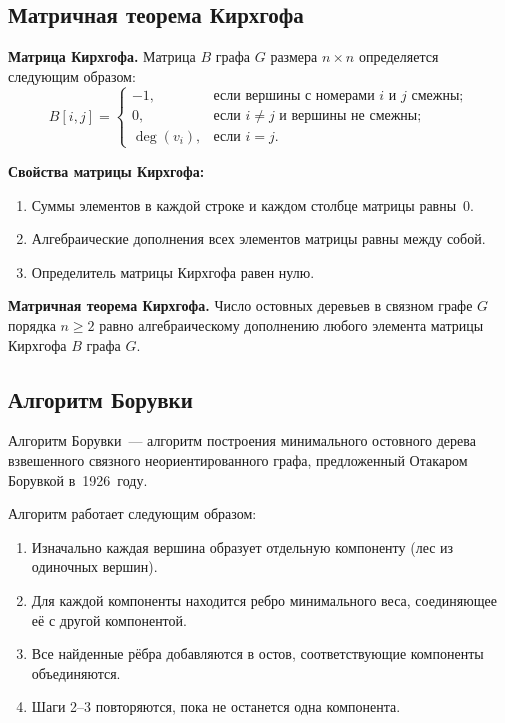 \documentclass[a4paper,final]{article}
\begin{document}
	\subsection{Матричная теорема Кирхгофа}

\textbf{Матрица Кирхгофа.} Матрица $B$ графа $G$ размера $n \times n$ определяется следующим образом:
\[
B[i,j] = \begin{cases}
-1, & \text{если вершины с номерами } i \text{ и } j \text{ смежны};\\[2pt]
0,  & \text{если } i \neq j \text{ и вершины не смежны};\\[2pt]
\deg(v_i), & \text{если } i = j.
\end{cases}
\]

\textbf{Свойства матрицы Кирхгофа:}
\begin{enumerate}
  \item Суммы элементов в каждой строке и каждом столбце матрицы равны~0.
  \item Алгебраические дополнения всех элементов матрицы равны между собой.
  \item Определитель матрицы Кирхгофа равен нулю.
\end{enumerate}

\textbf{Матричная теорема Кирхгофа.} Число остовных деревьев в связном графе $G$ порядка $n \geq 2$ равно алгебраическому дополнению любого элемента матрицы Кирхгофа $B$ графа $G$.

	\subsection{Алгоритм Борувки}

Алгоритм Борувки~--- алгоритм построения минимального остовного дерева взвешенного связного неориентированного графа, предложенный Отакаром Борувкой в~1926~году.

Алгоритм работает следующим образом:
\begin{enumerate}
  \item Изначально каждая вершина образует отдельную компоненту (лес из одиночных вершин).
  \item Для каждой компоненты находится ребро минимального веса, соединяющее её с другой компонентой.
  \item Все найденные рёбра добавляются в остов, соответствующие компоненты объединяются.
  \item Шаги 2--3 повторяются, пока не останется одна компонента.
\end{enumerate}
\end{document}
